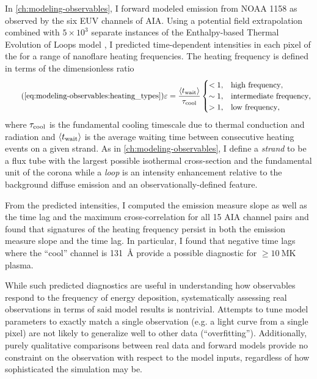 In \autoref{ch:modeling-observables}, I forward modeled emission from \AR{} NOAA 1158 as observed by the six EUV channels of AIA. Using a potential field extrapolation combined with $5\times10^3$ separate instances of the Enthalpy-based Thermal Evolution of Loops model \citep[EBTEL,][]{klimchuk_highly_2008,cargill_enthalpy-based_2012,cargill_enthalpy-based_2012-1,barnes_inference_2016}, I predicted time-dependent intensities in each pixel of the \AR{} for a range of nanoflare heating frequencies. The heating frequency is defined in terms of the dimensionless ratio 
\begin{equation}\tag{\ref{eq:modeling-observables:heating_types}}
    \varepsilon = \frac{\langle\twait\rangle}{\tau_{\textup{cool}}}
    \begin{cases} 
        < 1, &  \text{high frequency},\\
        \sim1, & \text{intermediate frequency}, \\
        > 1, & \text{low frequency},
     \end{cases}
\end{equation}
where $\tau_{\textup{cool}}$ is the fundamental cooling timescale due to thermal conduction and radiation \citep[see Appendix of][]{cargill_active_2014} and $\langle t_{\textup{wait}}\rangle$ is the average waiting time between consecutive heating events on a given strand. As in \autoref{ch:modeling-observables}, I define a \textit{strand} to be a flux tube with the largest possible isothermal cross-section and the fundamental unit of the corona while a \textit{loop} is an intensity enhancement relative to the background diffuse emission and an observationally-defined feature.

From the predicted intensities, I computed the emission measure slope as well as the time lag and the maximum cross-correlation for all 15 AIA channel pairs and found that signatures of the heating frequency persist in both the emission measure slope and the time lag. In particular, I found that negative time lags where the ``cool'' channel is \SI{131}{\angstrom} provide a possible diagnostic for $\ge\SI{10}{\mega\kelvin}$ plasma.

While such predicted diagnostics are useful in understanding how observables respond to the frequency of energy deposition, systematically assessing real observations in terms of said model results is nontrivial. Attempts to tune model parameters to exactly match a single observation (e.g. a light curve from a single pixel) are not likely to generalize well to other data (``overfitting''). Additionally, purely qualitative comparisons between real data and forward models provide no constraint on the observation with respect to the model inputs, regardless of how sophisticated the simulation may be.

